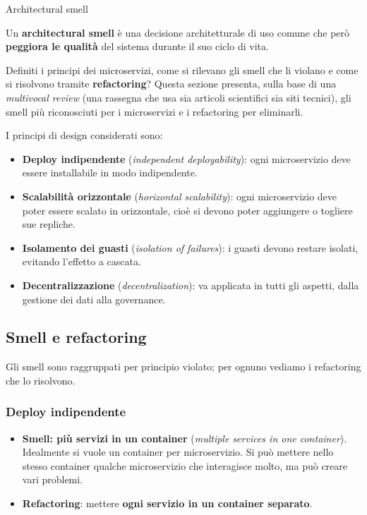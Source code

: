 \begin{boxdefinition}{Architectural smell}

Un \textbf{architectural smell} è una decisione architetturale di uso
comune che però \textbf{peggiora le qualità} del sistema durante il suo
ciclo di vita.

\end{boxdefinition}

Definiti i principi dei microservizi, come si rilevano gli smell che li
violano e come si risolvono tramite \textbf{refactoring}? Questa sezione
presenta, sulla base di una \emph{multivocal review} (una rassegna che
usa sia articoli scientifici sia siti tecnici), gli smell più
riconosciuti per i microservizi e i refactoring per eliminarli.

I principi di design considerati sono:

\begin{itemize}
\tightlist
\item
  \textbf{Deploy indipendente} (\emph{independent deployability}): ogni
  microservizio deve essere installabile in modo indipendente.
\item
  \textbf{Scalabilità orizzontale} (\emph{horizontal scalability}): ogni
  microservizio deve poter essere scalato in orizzontale, cioè si devono
  poter aggiungere o togliere sue repliche.
\item
  \textbf{Isolamento dei guasti} (\emph{isolation of failures}): i
  guasti devono restare isolati, evitando l'effetto a cascata.
\item
  \textbf{Decentralizzazione} (\emph{decentralization}): va applicata in
  tutti gli aspetti, dalla gestione dei dati alla governance.
\end{itemize}

\subsection{Smell e refactoring}\label{smell-e-refactoring}

Gli smell sono raggruppati per principio violato; per ognuno vediamo i
refactoring che lo risolvono.

\subsubsection{Deploy indipendente}\label{deploy-indipendente}

\begin{itemize}
\tightlist
\item
  \textbf{Smell: più servizi in un container} (\emph{multiple services
  in one container}). Idealmente si vuole un container per
  microservizio. Si può mettere nello stesso container qualche
  microservizio che interagisce molto, ma può creare vari problemi.
\item
  \textbf{Refactoring}: mettere \textbf{ogni servizio in un container
  separato}.
\end{itemize}

